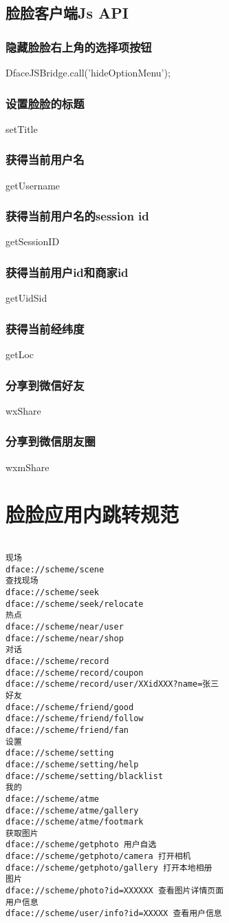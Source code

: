 \documentclass[cs4size]{ctexartutf8}
\begin{document}
\subsection{脸脸客户端Js API}

\subsubsection{隐藏脸脸右上角的选择项按钮}
DfaceJSBridge.call('hideOptionMenu');

\subsubsection{设置脸脸的标题}
setTitle

\subsubsection{获得当前用户名}
getUsername

\subsubsection{获得当前用户名的session id}
getSessionID

\subsubsection{获得当前用户id和商家id}
getUidSid

\subsubsection{获得当前经纬度}
getLoc

\subsubsection{分享到微信好友}
wxShare

\subsubsection{分享到微信朋友圈}
wxmShare


\section{脸脸应用内跳转规范}
\begin{verbatim}

现场
dface://scheme/scene
查找现场
dface://scheme/seek
dface://scheme/seek/relocate
热点
dface://scheme/near/user
dface://scheme/near/shop
对话
dface://scheme/record
dface://scheme/record/coupon
dface://scheme/record/user/XXidXXX?name=张三
好友
dface://scheme/friend/good
dface://scheme/friend/follow
dface://scheme/friend/fan
设置
dface://scheme/setting
dface://scheme/setting/help
dface://scheme/setting/blacklist
我的
dface://scheme/atme
dface://scheme/atme/gallery
dface://scheme/atme/footmark
获取图片
dface://scheme/getphoto 用户自选
dface://scheme/getphoto/camera 打开相机
dface://scheme/getphoto/gallery 打开本地相册
图片
dface://scheme/photo?id=XXXXXX 查看图片详情页面
用户信息
dface://scheme/user/info?id=XXXXX 查看用户信息
\end{verbatim}
\end{document}
